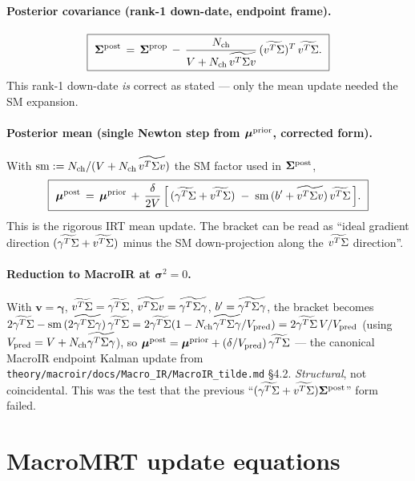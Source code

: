 \documentclass[11pt]{article}
\begin{document}
\paragraph{Posterior covariance (rank-1 down-date, endpoint frame).}
\begin{equation}
  \boxed{\
  \boldsymbol{\Sigma}^{\mathrm{post}}
  \,=\,
  \boldsymbol{\Sigma}^{\mathrm{prop}}
  \,-\,
  \frac{N_{\mathrm{ch}}}{V + N_{\mathrm{ch}}\,\widetilde{v^{T}\Sigma v}}\,(\widetilde{v^{T}\Sigma})^{T}\,\widetilde{v^{T}\Sigma}.
  \ }
  \label{eq:Sigma_post_IRT}
\end{equation}
This rank-1 down-date \emph{is} correct as stated --- only the mean update needed the SM expansion.

\paragraph{Posterior mean (single Newton step from $\boldsymbol{\mu}^{\mathrm{prior}}$, corrected form).}
With $\mathrm{sm} := N_{\mathrm{ch}} / (V + N_{\mathrm{ch}}\,\widetilde{v^{T}\Sigma v})$ the SM factor used in $\boldsymbol{\Sigma}^{\mathrm{post}}$,
\begin{equation}
  \boxed{\
  \boldsymbol{\mu}^{\mathrm{post}}
  \,=\,
  \boldsymbol{\mu}^{\mathrm{prior}}
  \,+\,
  \frac{\delta}{2V}\,\Bigl[\,(\widetilde{\gamma^{T}\Sigma} + \widetilde{v^{T}\Sigma})\;-\;\mathrm{sm}\,(b' + \widetilde{v^{T}\Sigma v})\,\widetilde{v^{T}\Sigma}\,\Bigr].
  \ }
  \label{eq:mu_post_IRT}
\end{equation}
This is the rigorous IRT mean update. The bracket can be read as ``ideal gradient direction $(\widetilde{\gamma^{T}\Sigma}+\widetilde{v^{T}\Sigma})$ minus the SM down-projection along the $\widetilde{v^{T}\Sigma}$ direction''.

\paragraph{Reduction to MacroIR at $\boldsymbol{\sigma}^2 = 0$.}
With $\mathbf{v}=\boldsymbol{\gamma}$, $\widetilde{v^{T}\Sigma}=\widetilde{\gamma^{T}\Sigma}$, $\widetilde{v^{T}\Sigma v}=\widetilde{\gamma^{T}\Sigma\gamma}$, $b'=\widetilde{\gamma^{T}\Sigma\gamma}$, the bracket becomes
\(
  2\widetilde{\gamma^{T}\Sigma} - \mathrm{sm}\,(2\widetilde{\gamma^{T}\Sigma\gamma})\,\widetilde{\gamma^{T}\Sigma} = 2\widetilde{\gamma^{T}\Sigma}(1 - N_{\mathrm{ch}}\widetilde{\gamma^{T}\Sigma\gamma}/V_{\mathrm{pred}}) = 2\widetilde{\gamma^{T}\Sigma}\,V/V_{\mathrm{pred}}
\)
(using $V_{\mathrm{pred}}=V+N_{\mathrm{ch}}\widetilde{\gamma^{T}\Sigma\gamma}$), so $\boldsymbol{\mu}^{\mathrm{post}} = \boldsymbol{\mu}^{\mathrm{prior}} + (\delta/V_{\mathrm{pred}})\,\widetilde{\gamma^{T}\Sigma}$ --- the canonical MacroIR endpoint Kalman update from \texttt{theory/macroir/docs/Macro\_IR/MacroIR\_tilde.md} \S4.2. \emph{Structural}, not coincidental. This was the test that the previous ``$(\widetilde{\gamma^{T}\Sigma}+\widetilde{v^{T}\Sigma})\boldsymbol{\Sigma}^{\mathrm{post}}$'' form failed.

\section{MacroMRT update equations}
\end{document}
